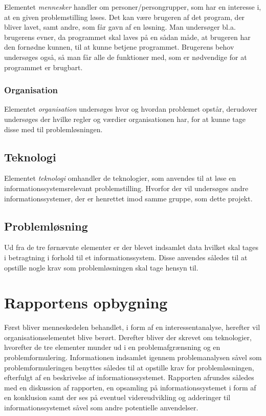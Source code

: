 Elementet \textit{mennesker} handler om personer/persongrupper, som har en interesse i, at en given
problemstilling løses. Det kan være brugeren af det program, der bliver lavet, samt andre, som får gavn af en
løsning. Man undersøger bl.a. brugerens evner, da programmet skal laves på en sådan måde, at brugeren har den
fornødne kunnen, til at kunne betjene programmet. Brugerens behov undersøges også, så man får alle de
funktioner med, som er nødvendige for at programmet er brugbart.


\subsubsection{Organisation}\label{subsec:organisation}

Elementet \textit{organisation} undersøges hvor og hvordan problemet opstår, derudover undersøges der hvilke
regler og værdier organisationen har, for at kunne tage disse med til problemløsningen.


\subsection{Teknologi}\label{subsec:Teknologi}

Elementet \textit{teknologi} omhandler de teknologier, som anvendes til at løse en informationssystemsrelevant
problemstilling. Hvorfor der vil undersøges andre informationssystemer, der er henrettet imod samme gruppe, som dette projekt.

\subsection{Problemløsning}
Ud fra de tre førnævnte elementer er der blevet indsamlet data hvilket skal tages i betragtning i forhold til et informationssystem. Disse anvendes således til at opstille nogle krav som problemløsningen skal tage hensyn til.

\section{Rapportens opbygning}\label{sec:rapportens-opbygning}

Først bliver menneskedelen behandlet, i form af en interessentanalyse, herefter vil organisationselementet
blive berørt. Derefter bliver der skrevet om teknologier, hvorefter de tre elementer munder ud i en
problemafgrænsning og en problemformulering. 
Informationen indsamlet igennem problemanalysen såvel som problemformuleringen benyttes således til at opstille krav for problemløsningen, efterfulgt af en beskrivelse af informationssystemet. Rapporten afrundes således med en diskussion af rapporten, en opsamling på informationssystemet i form af en konklusion samt der ses på eventuel videreudvikling og adderinger til informationssystemet såvel som andre potentielle anvendelser.